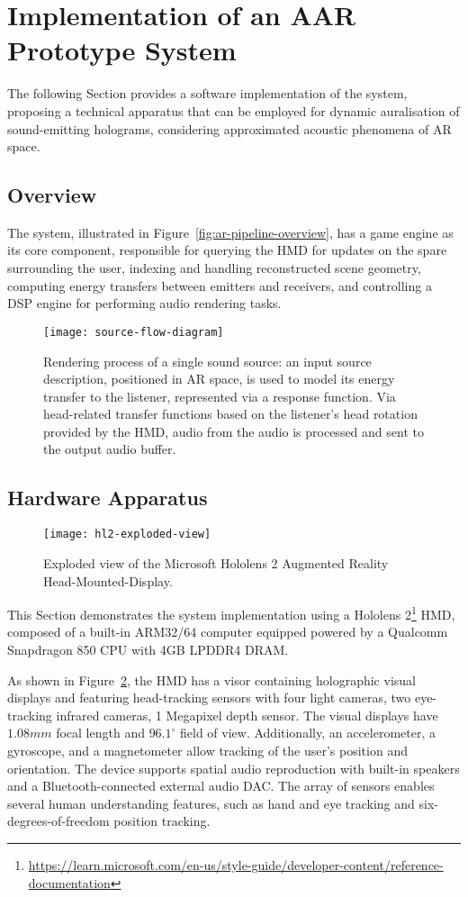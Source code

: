 \section{Implementation of an AAR Prototype System}
The following Section provides a software implementation of the system, proposing a technical apparatus that can be employed for dynamic auralisation of sound-emitting holograms, considering approximated acoustic phenomena of AR space.

\subsection{Overview}
The system, illustrated in Figure~\ref{fig:ar-pipeline-overview}, has a game engine as its core component, responsible for querying the HMD for updates on the spare surrounding the user, indexing and handling reconstructed scene geometry, computing energy transfers between emitters and receivers, and controlling a DSP engine for performing audio rendering tasks.
\begin{figure}[htb]
    \centering
    \texttt{[image: source-flow-diagram]}
    \caption{Rendering process of a single sound source: an input source description, positioned in AR space, is used to model its energy transfer to the listener, represented via a response function. Via head-related transfer functions based on the listener's head rotation provided by the HMD, audio from the audio is processed and sent to the output audio buffer.}
\label{fig:source-flow-diagram}
\end{figure}

\subsection{Hardware Apparatus}
\begin{figure}[h]
    \centering
    \texttt{[image: hl2-exploded-view]}
    \caption{Exploded view of the Microsoft Hololens 2 Augmented Reality Head-Mounted-Display.}
\label{fig:hl2-exploded-view}
\end{figure}
This Section demonstrates the system implementation using a Hololens 2\footnote{\href{learn.microsoft.com/en-us/style-guide/developer-content/reference-documentation}{https://learn.microsoft.com/en-us/style-guide/developer-content/reference-documentation}} HMD, composed of a built-in ARM32/64 computer equipped powered by a Qualcomm Snapdragon 850 CPU with 4GB LPDDR4 DRAM.\par
As shown in Figure~\ref{fig:hl2-exploded-view}, the HMD has a visor containing holographic visual displays and featuring head-tracking sensors with four light cameras, two eye-tracking infrared cameras, 1 Megapixel depth sensor. The visual displays have $1.08mm$ focal length and $96.1^\circ$ field of view. Additionally, an accelerometer, a gyroscope, and a magnetometer allow tracking of the user's position and 
orientation. The device supports spatial audio reproduction with built-in speakers and a Bluetooth-connected external audio DAC. The array of sensors enables several human understanding features, such as hand and eye tracking and six-degrees-of-freedom position tracking.

